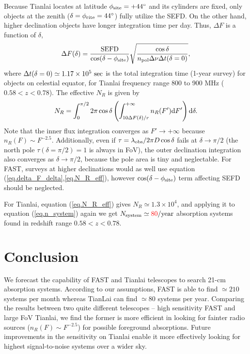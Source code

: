 \documentclass[]{raa}
\newcommand{\diff}{{\rm d}}
\newcommand{\tcr}{\textcolor{red}}
\begin{document}
Because Tianlai locates at latitude
$\phi_{\rm site}=+44^\circ$ and its cylinders are fixed, only
objects at the zenith ($\delta=\phi_{\rm cite}=44^\circ$) fully utilize
the SEFD. On the other hand, higher declination objects
have longer integration time per day. Thus, $\Delta F$ is
a function of $\delta$, 
\begin{equation}\label{eq.delta_F_delta}
    \Delta F(\delta) = \frac{\rm SEFD}{\cos(\delta-\phi_{\rm site})}
    {\sqrt{\frac{\cos\delta}{n_{\rm pol}\Delta\nu\Delta t(\delta=0)}}},
\end{equation}
where $\Delta t(\delta=0)\simeq 1.17\times 10^5\ {\rm sec}$ is the
total integration time (1-year survey) for objects on celestial equator,
for Tianlai frequency range 800 to 900 MHz ($0.58<z<0.78$).
The effective $N_R$ is given by
\begin{equation}\label{eq.N_R_eff}
    N_R=\int_0^{\pi/2}2\pi\cos\delta
    \left(\int_{10\Delta F(\delta)/r}^{+\infty}
    n_R(F')\diff F'\right)
    \diff\delta.
\end{equation}
Note that the inner flux integration converges as
$F'\rightarrow+\infty$ because $n_R(F)\sim F^{-2.5}$.
Additionally, even if $\tau=\lambda_{\rm obs}/2\pi D\cos\delta$
fails at $\delta\rightarrow\pi/2$ (the north pole
$\tau(\delta=\pi/2)=1$ is always in FoV),
the outer declination integration also converges
as $\delta\rightarrow\pi/2$, because the pole area is
tiny and neglectable.
For FAST, surveys at higher declinations would as well
use equation (\ref{eq.delta_F_delta},\ref{eq.N_R_eff}),
however $\cos(\delta-\phi_{\rm site})$ term affecting
SEFD should be neglected.

For Tianlai, equation (\ref{eq.N_R_eff}) gives $N_R\simeq 1.3\times 10^4$,
and applying it to equation (\ref{eq.n_system}) again
we get $N_{\rm system}\simeq \tcr{80} {\rm /year}$ absorption
systems found in redshift range $0.58<z<0.78$.


\section{Conclusion}\label{sec.conclusion}
We forecast the capability of FAST and Tianlai telescopes to search 21-cm
absorption systems. According to our assumptions, FAST is able
to find $\simeq 210$ systems per month
whereas TianLai can find $\simeq 80$ systems per year.
Comparing the results between two quite different telescopes --
high sensitivity FAST and large FoV Tianlai, we find the former is
more efficient in looking for fainter radio sources
($n_R(F)\sim F^{-2.5}$) for possible foreground absorptions.
Future improvements in the sensitivity on Tianlai enable it
more effectively looking for highest signal-to-noise systems
over a wider sky.
\end{document}
